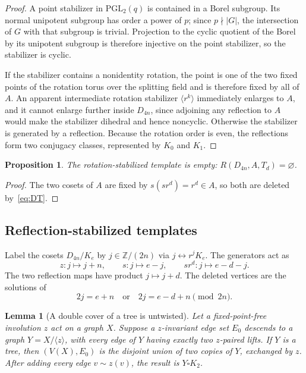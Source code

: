 \documentclass[11pt]{article}
\newtheorem{proposition}[theorem]{Proposition}
\newtheorem{lemma}[theorem]{Lemma}
\theoremstyle{definition}
\theoremstyle{remark}
\newcommand{\PGL}{\mathrm{PGL}}
\newcommand{\Z}{\mathbb{Z}}
\begin{document}
\begin{proof}
A point stabilizer in $\PGL_2(q)$ is contained in a Borel subgroup. Its normal unipotent subgroup has
order a power of $p$; since $p\nmid|G|$, the intersection of $G$ with that subgroup is trivial.
Projection to the cyclic quotient of the Borel by its unipotent subgroup is therefore injective on
the point stabilizer, so the stabilizer is cyclic.

If the stabilizer contains a nonidentity rotation, the point is one of the two fixed points of the
rotation torus over the splitting field and is therefore fixed by all of $A$. An apparent
intermediate rotation stabilizer $\langle r^k\rangle$ immediately enlarges to $A$, and it cannot
enlarge further inside $D_{4n}$, since adjoining any reflection to $A$ would make the stabilizer
dihedral and hence noncyclic. Otherwise the stabilizer is generated by a reflection. Because the
rotation order is even, the reflections form two conjugacy classes, represented by $K_0$ and $K_1$.
\end{proof}

\begin{proposition}
\label{prop:rotation-empty}
The rotation-stabilized template is empty: $R(D_{4n},A,T_d)=\varnothing$.
\end{proposition}

\begin{proof}
The two cosets of $A$ are fixed by $s(sr^d)=r^d\in A$, so both are deleted by~\eqref{eq:DT}.
\end{proof}

\subsection{Reflection-stabilized templates}

Label the cosets $D_{4n}/K_e$ by $j\in\Z/(2n)$ via $j\leftrightarrow r^jK_e$. The generators act as
\begin{equation}
  z:j\mapsto j+n,\qquad s:j\mapsto e-j,\qquad sr^d:j\mapsto e-d-j .
  \label{eq:triple-coset-action}
\end{equation}
The two reflection maps have product $j\mapsto j+d$. The deleted vertices are the solutions of
\begin{equation}
  2j=e+n\quad\text{or}\quad 2j=e-d+n \pmod{2n}.
  \label{eq:deleted}
\end{equation}

\begin{lemma}[A double cover of a tree is untwisted]
\label{lem:double-cover}
Let a fixed-point-free involution $z$ act on a graph $X$. Suppose a $z$-invariant edge set $E_0$
descends to a graph $Y=X/\langle z\rangle$, with every edge of $Y$ having exactly two $z$-paired
lifts. If $Y$ is a tree, then $(V(X),E_0)$ is the disjoint union of two copies of $Y$, exchanged by
$z$. After adding every edge $v\sim z(v)$, the result is $Y\square K_2$.
\end{lemma}
\end{document}
